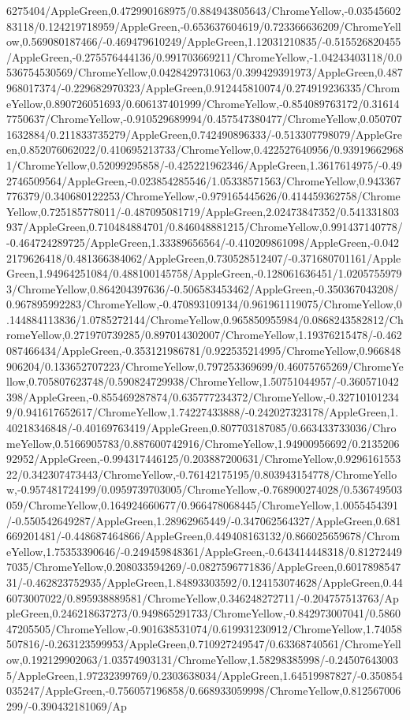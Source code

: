 {\begin{tikzternal}
6275404/AppleGreen,0.472990168975/0.884943805643/ChromeYellow,-0.0354560283118/0.124219718959/AppleGreen,-0.653637604619/0.723366636209/ChromeYellow,0.569080187466/-0.469479610249/AppleGreen,1.12031210835/-0.515526820455/AppleGreen,-0.275576444136/0.991703669211/ChromeYellow,-1.04243403118/0.0536754530569/ChromeYellow,0.0428429731063/0.399429391973/AppleGreen,0.487968017374/-0.229682970323/AppleGreen,0.912445810074/0.274919236335/ChromeYellow,0.890726051693/0.606137401999/ChromeYellow,-0.854089763172/0.316147750637/ChromeYellow,-0.910529689994/0.457547380477/ChromeYellow,0.0507071632884/0.211833735279/AppleGreen,0.742490896333/-0.513307798079/AppleGreen,0.852076062022/0.410695213733/ChromeYellow,0.422527640956/0.939196629681/ChromeYellow,0.52099295858/-0.425221962346/AppleGreen,1.3617614975/-0.492746509564/AppleGreen,-0.023854285546/1.05338571563/ChromeYellow,0.943367776379/0.340680122253/ChromeYellow,-0.979165445626/0.414459362758/ChromeYellow,0.725185778011/-0.487095081719/AppleGreen,2.02473847352/0.541331803937/AppleGreen,0.710484884701/0.846048881215/ChromeYellow,0.991437140778/-0.464724289725/AppleGreen,1.33389656564/-0.410209861098/AppleGreen,-0.0422179626418/0.481366384062/AppleGreen,0.730528512407/-0.371680701161/AppleGreen,1.94964251084/0.488100145758/AppleGreen,-0.128061636451/1.02057559793/ChromeYellow,0.864204397636/-0.506583453462/AppleGreen,-0.350367043208/0.967895992283/ChromeYellow,-0.470893109134/0.961961119075/ChromeYellow,0.144884113836/1.0785272144/ChromeYellow,0.965850955984/0.0868243582812/ChromeYellow,0.271970739285/0.897014302007/ChromeYellow,1.19376215478/-0.462087466434/AppleGreen,-0.353121986781/0.922535214995/ChromeYellow,0.966848906204/0.133652707223/ChromeYellow,0.797253369699/0.46075765269/ChromeYellow,0.705807623748/0.590824729938/ChromeYellow,1.50751044957/-0.360571042398/AppleGreen,-0.855469287874/0.635777234372/ChromeYellow,-0.327101012349/0.941617652617/ChromeYellow,1.74227433888/-0.242027323178/AppleGreen,1.40218346848/-0.40169763419/AppleGreen,0.807703187085/0.663433733036/ChromeYellow,0.5166905783/0.887600742916/ChromeYellow,1.94900956692/0.213520692952/AppleGreen,-0.994317446125/0.203887200631/ChromeYellow,0.929616155322/0.342307473443/ChromeYellow,-0.76142175195/0.803943154778/ChromeYellow,-0.957481724199/0.0959739703005/ChromeYellow,-0.768900274028/0.536749503059/ChromeYellow,0.164924660677/0.966478068445/ChromeYellow,1.0055454391/-0.550542649287/AppleGreen,1.28962965449/-0.347062564327/AppleGreen,0.681669201481/-0.448687464866/AppleGreen,0.449408163132/0.866025659678/ChromeYellow,1.75353390646/-0.249459848361/AppleGreen,-0.643414448318/0.812724497035/ChromeYellow,0.208033594269/-0.0827596771836/AppleGreen,0.601789854731/-0.462823752935/AppleGreen,1.84893303592/0.124153074628/AppleGreen,0.446073007022/0.895938889581/ChromeYellow,0.346248272711/-0.204757513763/AppleGreen,0.246218637273/0.949865291733/ChromeYellow,-0.842973007041/0.586047205505/ChromeYellow,-0.901638531074/0.619931230912/ChromeYellow,1.74058507816/-0.263123599953/AppleGreen,0.710927249547/0.63368740561/ChromeYellow,0.192129902063/1.03574903131/ChromeYellow,1.58298385998/-0.245076430035/AppleGreen,1.97232399769/0.2303638034/AppleGreen,1.64519987827/-0.350854035247/AppleGreen,-0.756057196858/0.668933059998/ChromeYellow,0.812567006299/-0.390432181069/Ap
\end{tikzternal}}
